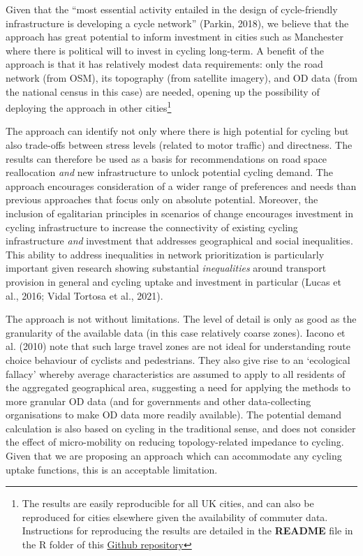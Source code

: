 \documentclass[
]{article}
\begin{document}
Given that the ``most essential activity entailed in the design of
cycle-friendly infrastructure is developing a cycle network''
(Parkin, 2018), we believe that the approach has great
potential to inform investment in cities such as Manchester where there
is political will to invest in cycling long-term. A benefit of the
approach is that it has relatively modest data requirements: only the
road network (from OSM), its topography (from satellite imagery), and
OD data (from the national census in this case) are
needed, opening up the possibility of deploying the approach in other
cities\footnote{The results are easily reproducible for all UK cities, and can also be reproduced for cities elsewhere given the availability of commuter data. Instructions for reproducing the results are detailed in the \textbf{README} file in the R folder of this \href{https://github.com/Hussein-Mahfouz/cycle-networks}{Github repository}}

The approach can identify not only where there is high
potential for cycling but also trade-offs between
stress levels (related to motor traffic) and directness.
The results can therefore be used as a basis for recommendations on
road space reallocation \emph{and} new infrastructure to unlock potential cycling demand.
The approach encourages consideration of a wider range of preferences
and needs than previous approaches that focus only on absolute potential.
Moreover, the inclusion of egalitarian principles in scenarios of change
encourages investment in cycling infrastructure to
increase the connectivity of existing cycling infrastructure
\emph{and} investment that addresses geographical and social inequalities.
This ability to address inequalities in network prioritization is particularly
important given research showing substantial \emph{inequalities}
around transport provision in general and cycling uptake and investment
in particular (Lucas et al., 2016; Vidal Tortosa et al., 2021).

The approach is not without limitations. The level of detail is only as
good as the granularity of the available data (in this case relatively
coarse zones). Iacono et al. (2010) note that such large travel zones
are not ideal for understanding route choice behaviour of cyclists and
pedestrians. They also give rise to an `ecological fallacy' whereby
average characteristics are assumed to apply to all residents of the
aggregated geographical area, suggesting a need for applying the methods
to more granular OD data (and for governments and other
data-collecting organisations to make OD data more
readily available).
The potential demand calculation is also based on cycling in the traditional sense, and does not consider the
effect of micro-mobility on reducing topology-related impedance to cycling. Given that we are proposing an approach which can accommodate any cycling uptake functions, this is an acceptable limitation.
\end{document}
